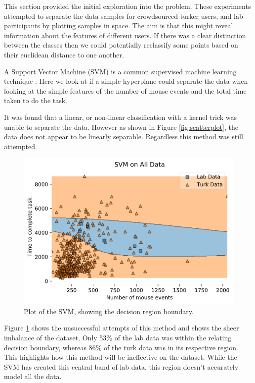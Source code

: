 \documentclass{article}
\begin{document}
This section provided the initial exploration into the problem.
These experiments attempted to separate the data samples for crowdsourced turker users, and lab participants by plotting samples in space.
The aim is that this might reveal information about the features of different users.
If there was a clear distinction between the classes then we could potentially reclassify some points based on their euclidean distance to one another.

A Support Vector Machine (SVM) is a common supervised machine learning technique \cite{noble2006support}.
Here we look at if a simple hyperplane could separate the data when looking at the simple features of the number of mouse events and the total time taken to do the task. 

It was found that a linear, or non-linear classification with a kernel trick was unable to separate the data.
However as shown in Figure \ref{fig:scatterplot}, the data does not appear to be linearly separable.
Regardless this method was still attempted.

\begin{figure}[ht]
    \centering
    \includegraphics[scale=0.6]{Images/SVM-Decision-Region-Boundary.png}
    \caption{Plot of the SVM, showing the decision region boundary.}
    \label{fig:SVM}
\end{figure}

Figure \ref{fig:SVM} shows the unsuccessful attempts of this method and shows the sheer imbalance of the dataset.
Only 53\% of the lab data was within the relating decision boundary, whereas 86\% of the turk data was in its respective region.
This highlights how this method will be ineffective on the dataset.
While the SVM has created this central band of lab data, this region doesn't accurately model all the data. 
\end{document}
